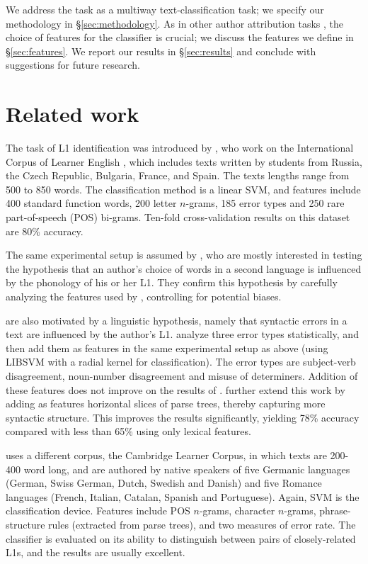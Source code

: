 \documentclass[11pt,letterpaper]{article}
\newcommand{\Sref}[1]{\S\ref{#1}}
\begin{document}
We address the task as a multiway text-classification task; we specify
our methodology in \Sref{sec:methodology}. As in other author
attribution tasks \citep{joula:2006}, the choice of features for the
classifier is crucial; we discuss the features we define in
\Sref{sec:features}. We report our results in
\Sref{sec:results} and conclude with suggestions for future
research.

\section{Related work}
\label{sec:literature}
The task of L1 identification was introduced by
\citet{koppel2005automatically,koppel2005determining}, who work on the
International Corpus of Learner English \citep{icle}, which includes
texts written by students from Russia, the Czech Republic, Bulgaria,
France, and Spain. The texts lengths range from 500 to 850 words. The
classification method is a linear SVM, and features include 400
standard function words, 200 letter $n$-grams, 185 error types and 250
rare part-of-speech (POS) bi-grams. Ten-fold cross-validation results
on this dataset are 80\% accuracy.

The same experimental setup is assumed by
\citet{tsur-rappoport:2007:Cognitive-2007}, who are mostly interested
in testing the hypothesis that an author's choice of words in a second
language is influenced by the phonology of his or her L1. They confirm
this hypothesis by carefully analyzing the features used by
\citeauthor{koppel2005automatically}, controlling for potential
biases.

\citet{Wong-Dras:2009:ALTA2009,wong-dras:2011:EMNLP} are also
motivated by a linguistic hypothesis, namely that syntactic errors in
a text are influenced by the author's
L1. \citet{Wong-Dras:2009:ALTA2009} analyze three error types
statistically, and then add them as features in the same experimental
setup as above (using LIBSVM with a radial kernel for
classification). The error types are subject-verb disagreement,
noun-number disagreement and misuse of determiners. Addition of these
features does not improve on the results of
\citeauthor{koppel2005automatically}. \citet{wong-dras:2011:EMNLP}
further extend this work by adding as features horizontal slices of
parse trees, thereby capturing more syntactic structure. This improves
the results significantly, yielding 78\% accuracy compared with less
than 65\% using only lexical features.

\citet{kochmar2011identification} uses a different corpus, the
Cambridge Learner Corpus, in which texts are 200-400 word long, and
are authored by native speakers of five Germanic languages (German,
Swiss German, Dutch, Swedish and Danish) and five Romance languages
(French, Italian, Catalan, Spanish and Portuguese). Again, SVM is the
classification device. Features include POS $n$-grams, character
$n$-grams, phrase-structure rules (extracted from parse trees), and
two measures of error rate. The classifier is evaluated on its ability
to distinguish between pairs of closely-related L1s, and the results
are usually excellent.
\end{document}
